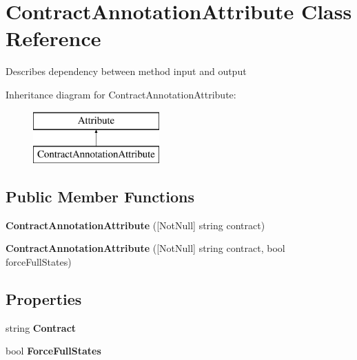\hypertarget{class_contract_annotation_attribute}{}\section{Contract\+Annotation\+Attribute Class Reference}
\label{class_contract_annotation_attribute}


Describes dependency between method input and output  


Inheritance diagram for Contract\+Annotation\+Attribute\+:\begin{figure}[H]
\begin{center}
\leavevmode
\includegraphics[height=2.000000cm]{class_contract_annotation_attribute}
\end{center}
\end{figure}
\subsection*{Public Member Functions}
\begin{DoxyCompactItemize}
\item 
\hypertarget{class_contract_annotation_attribute_a635552c48df4e94f26deb7598f7a5028}{}{\bfseries Contract\+Annotation\+Attribute} (\mbox{[}Not\+Null\mbox{]} string contract)\label{class_contract_annotation_attribute_a635552c48df4e94f26deb7598f7a5028}

\item 
\hypertarget{class_contract_annotation_attribute_a886eedce3d8c7a269549a3293a2bfd99}{}{\bfseries Contract\+Annotation\+Attribute} (\mbox{[}Not\+Null\mbox{]} string contract, bool force\+Full\+States)\label{class_contract_annotation_attribute_a886eedce3d8c7a269549a3293a2bfd99}

\end{DoxyCompactItemize}
\subsection*{Properties}
\begin{DoxyCompactItemize}
\item 
\hypertarget{class_contract_annotation_attribute_a19445968a4365371890d047311eaa1c4}{}string {\bfseries Contract}\label{class_contract_annotation_attribute_a19445968a4365371890d047311eaa1c4}

\item 
\hypertarget{class_contract_annotation_attribute_a329c6f99fe2ed0c08df3898586cbf965}{}bool {\bfseries Force\+Full\+States}\label{class_contract_annotation_attribute_a329c6f99fe2ed0c08df3898586cbf965}

\end{DoxyCompactItemize}


